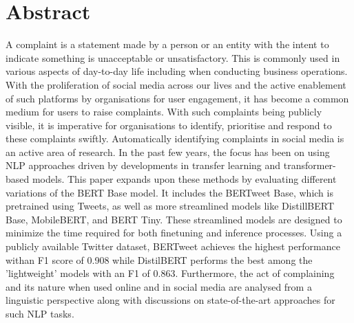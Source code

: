 \chapter*{\Large \center Abstract}

A complaint is a statement made by a person or an entity with the intent to indicate something is unacceptable or unsatisfactory. This is commonly used in various aspects of day-to-day life including when conducting business operations. With the proliferation of social media across our lives and the active enablement of such platforms by organisations for user engagement, it has become a common medium for users to raise complaints. With such complaints being publicly visible, it is imperative for organisations to identify, prioritise and respond to these complaints swiftly. Automatically identifying complaints in social media is an active area of research. In the past few years, the focus has been on using NLP approaches driven by developments in transfer learning and transformer-based models.
\newline \newline
This paper expands upon these methods by evaluating different variations of the BERT Base model. It includes the BERTweet Base, which is pretrained using Tweets, as well as more streamlined models like DistillBERT Base, MobileBERT, and BERT Tiny. These streamlined models are designed to minimize the time required for both finetuning and inference processes. Using a publicly available Twitter dataset, BERTweet achieves the highest performance withan F1 score of 0.908 while DistilBERT performs the best among the 'lightweight' models with an F1 of 0.863. Furthermore, the act of complaining and its nature when used online and in social media are analysed from a linguistic perspective along with discussions on state-of-the-art approaches for such NLP tasks.
\newline \newline
